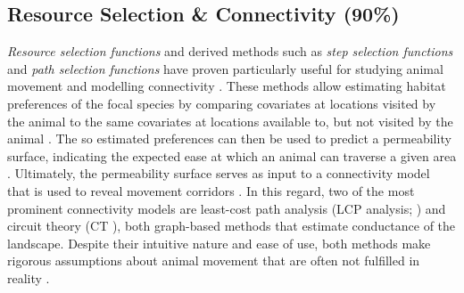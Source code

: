 \documentclass[abstract=on,10pt,a4paper,bibliography=totocnumbered]{article}
\begin{document}
\subsection{Resource Selection \& Connectivity (90\%)}
\textit{Resource selection functions} \citep{Boyce.2002} and derived methods
such as \textit{step selection functions} \citep{Fortin.2005} and \textit{path
selection functions} \citep{Cushman.2010} have proven particularly useful for
studying animal movement \citep{Fieberg.2020} and modelling connectivity
\citep{Diniz.2020}. These methods allow estimating habitat preferences of the
focal species by comparing covariates at locations visited by the animal to the
same covariates at locations available to, but not visited by the animal
\citep{Boyce.2002, Fortin.2005, Cushman.2010, Thurfjell.2014}. The so estimated
preferences can then be used to predict a permeability surface, indicating the
expected ease at which an animal can traverse a given area \citep{Spear.2010,
Zeller.2012, Etherington.2016}. Ultimately, the permeability surface serves as
input to a connectivity model that is used to reveal movement corridors
\citep{Diniz.2020}. In this regard, two of the most prominent connectivity
models are least-cost path analysis (LCP analysis; \citealp{Adriaensen.2003})
and circuit theory (CT \citealp{McRae.2006, McRae.2008}), both graph-based
methods that estimate conductance of the landscape. Despite their intuitive
nature and ease of use, both methods make rigorous assumptions about animal
movement that are often not fulfilled in reality \citep{Diniz.2020}.

\end{document}
